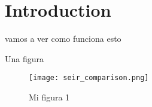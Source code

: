 \section{Introduction}

vamos a ver como funciona esto

Una figura

\begin{figure}[htb]
\centering
\texttt{[image: seir\_comparison.png]}
\caption{Mi figura 1}
\label{fig:seir1}
\end{figure}

